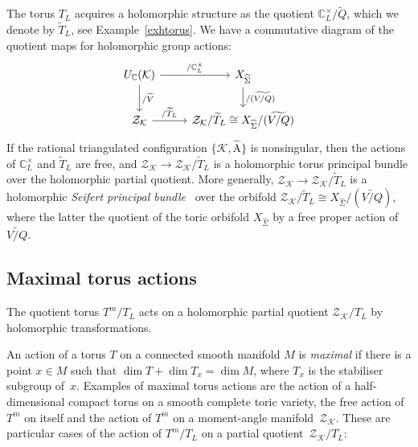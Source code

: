 \documentclass[a4paper]{amsart}
\theoremstyle{definition}
\theoremstyle{remark}
\numberwithin{equation}{section}
\def\C{\mathbb C}
\def\sK{\mathcal K}
\newcommand{\zk}{\mathcal Z_{\mathcal K}}
\newcommand{\<}{\langle}
\renewcommand{\>}{\rangle}
\begin{document}
The torus $T_L$ acquires a holomorphic structure as the quotient $\C^\times_L/\widetilde Q$, which we denote by $\widetilde T_L$, see Example~\ref{exhtorus}. We have a commutative diagram of the quotient maps for holomorphic group actions:
\begin{equation}\label{diaghpq}
\begin{tikzcd}
  U_\C(\sK) \ar{r}{/\C^\times_L} \ar{d}{/\widetilde V} 
   & X_{\widehat\Sigma} \ar{d}{/(\widetilde{V/Q})}\\
  \zk \ar{r}{/\widetilde T_L} & \zk/\widetilde T_L\cong X_{\widehat\Sigma}/(\widetilde{V/Q})
\end{tikzcd}
\end{equation}
If the rational triangulated configuration $\{\sK,\widehat{\mathrm A}\}$ is nonsingular, then the actions of 
$\C^\times_L$ and $\widetilde T_L$ are free, and $\zk\to\zk/\widetilde T_L$ is a holomorphic torus principal bundle over the holomorphic partial quotient. More generally, $\zk\to\zk/\widetilde T_L$ is a holomorphic \emph{Seifert principal bundle}~\cite[\S5.1]{orli72} over the orbifold $\zk/\widetilde T_L\cong X_{\widehat\Sigma}/(\widetilde{V/Q})$, where the latter the quotient of the toric orbifold $X_{\widehat\Sigma}$ by a free proper action of~$\widetilde{V/Q}$.


\subsection{Maximal torus actions}
The quotient torus $T^m/T_L$ acts on a holomorphic partial quotient $\zk/T_L$ by holomorphic transformations. 

An action of a torus $T$ on a connected smooth manifold $M$ is \emph{maximal} if there is a point $x\in M$ such that $\dim T+\dim T_x=\dim M$, where $T_x$ is the stabiliser subgroup of~$x$. Examples of maximal torus actions are the action of a half-dimensional compact torus on a smooth complete toric variety, the free action of $T^m$ on itself and the action of $T^m$ on a moment-angle manifold~$\zk$. These are particular cases of the action of $T^m/T_L$ on a partial quotient~$\zk/T_L$:
\end{document}
